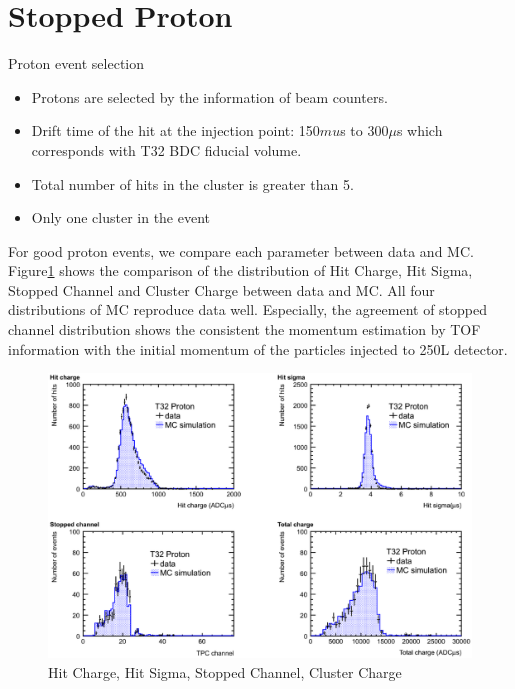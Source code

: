 \section{Stopped Proton}
\label{Sec:Proton}

%
Proton event selection
\begin{itemize}
\item Protons are selected by the information of beam counters.
\item Drift time of the hit at the injection point: 150$mu$s to 300$\mu$s which corresponds with T32 BDC fiducial volume.
\item Total number of hits in the cluster is greater than 5.
\item Only one cluster in the event
\end{itemize}

For good proton events, we compare each parameter between data and MC.
Figure\ref{fig:various_distribution} shows the comparison of the distribution of 
Hit Charge, Hit Sigma, Stopped Channel and  Cluster Charge between data and MC.
All four distributions of MC reproduce data well.
Especially, the agreement of stopped channel distribution shows the consistent 
the momentum estimation by TOF information with the initial momentum of the particles injected to 250L detector.\\

\begin{figure}[htbp]
  \centering
  \includegraphics[width=1.0\hsize,clip]{./fig/stop_proton1.eps}
  \caption{Hit Charge, Hit Sigma, Stopped Channel, Cluster Charge}
  \label{fig:various_distribution}
\end{figure}

